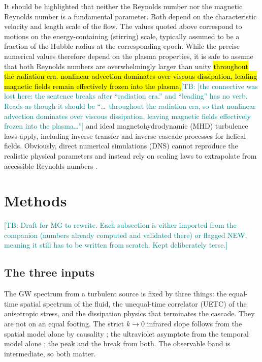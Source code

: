 \documentclass[prd,twocolumn,aps,psfig,nobibnotes,superscriptaddress,preprintnumbers,times]{revtex4}
\newcommand{\flag}[1]{\hl{#1}}
\newcommand{\tb}[1]{{\textcolor{teal}{{[TB: #1]}}}}
\begin{document}
It should be highlighted that neither the Reynolds number nor the magnetic Reynolds number is a fundamental parameter. Both depend on the characteristic velocity and length scale of the flow. The values quoted above correspond to motions on the energy-containing (stirring) scale, typically assumed to be a fraction of the Hubble radius at the corresponding epoch. While the precise numerical values therefore depend on the plasma properties, it is safe to assume that both Reynolds numbers are overwhelmingly larger than unity \flag{throughout the radiation era. nonlinear advection dominates over viscous dissipation, leading magnetic fields remain effectively frozen into the plasma,}\tb{[the connective was lost here: the sentence breaks after ``radiation era.'' and ``leading'' has no verb. Reads as though it should be ``\ldots\ throughout the radiation era, so that nonlinear advection dominates over viscous dissipation, leaving magnetic fields effectively frozen into the plasma\ldots''} and ideal magnetohydrodynamic (MHD) turbulence laws apply, including inverse transfer and inverse cascade processes for helical fields.  Obviously,  direct numerical simulations (DNS) cannot reproduce the realistic physical parameters and instead rely on scaling laws to extrapolate from accessible Reynolds numbers
\cite{RoperPol:2019wvy,Kahniashvili:2020jgm,Auclair:2022jod,Schekochihin:2020aqu}.


\section{Methods}

\tb{Draft for MG to rewrite. Each subsection is either imported from the companion
(numbers already computed and validated there) or flagged NEW, meaning it still has to
be written from scratch. Kept deliberately terse.}

\subsection{The three inputs}

The GW spectrum from a turbulent source is fixed by three things: the equal-time spatial
spectrum of the fluid, the unequal-time correlator (UETC) of the anisotropic stress, and
the dissipation physics that terminates the cascade. They are not on an equal footing.
The strict $k\to0$ infrared slope follows from the spatial model alone by causality
\cite{Cai:2019cdl}; the ultraviolet asymptote from the temporal model alone
\cite{Zhou:1996,Rubinstein:2000}; the peak and the break from both. The observable band
is intermediate, so both matter.
\end{document}
